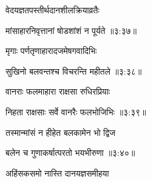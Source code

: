 {\devanagarifont वेदयज्ञतपस्तीर्थदानशीलक्रियाव्रतैः \thinspace{\dandab} \dontdisplaylinenum }%


{\devanagarifont मांसाहारनिवृत्तानां षोडशांशं न पूर्यते {॥३:३७॥} \veg\dontdisplaylinenum }%

{\devanagarifont मृगाः पर्णतृणाहारादजमेषगवादिभिः \thinspace{\dandab} \dontdisplaylinenum }%


{\devanagarifont सुखिनो बलवन्तश्च विचरन्ति महीतले {॥३:३८॥} \veg\dontdisplaylinenum }%
 
{\devanagarifont वानराः फलमाहारा राक्षसा रुधिरप्रियाः \thinspace{\dandab} \dontdisplaylinenum }%


{\devanagarifont निहता राक्षसाः सर्वे वानरैः फलभोजिभिः {॥३:३९॥} \veg\dontdisplaylinenum }%

{\devanagarifont तस्मान्मांसं न हीहेत बलकामेन भो द्विज \thinspace{\dandab} \dontdisplaylinenum }%


{\devanagarifont बलेन च गुणाकर्षात्परतो भयभीरुणा {॥३:४०॥} \veg\dontdisplaylinenum }%

{\devanagarifont अहिंसकसमो नास्ति दानयज्ञसमीहया \thinspace{\dandab} \dontdisplaylinenum }%

